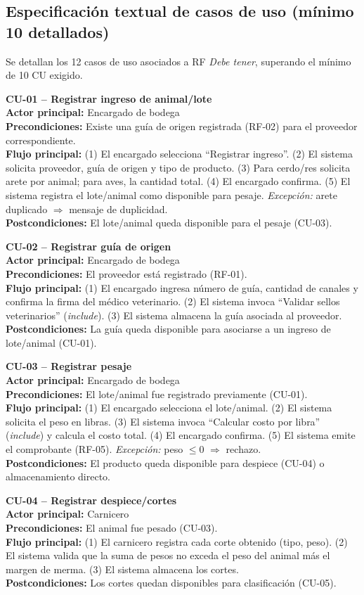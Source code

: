 \documentclass[11pt,a4paper]{article}
\begin{document}
\subsection{Especificación textual de casos de uso (mínimo 10 detallados)}
Se detallan los 12 casos de uso asociados a RF \textit{Debe tener}, superando el mínimo de 10 CU exigido.

\newcommand{\cuitem}[6]{%
\noindent\textbf{#1 -- #2}\\
\textbf{Actor principal:} #3\\
\textbf{Precondiciones:} #4\\
\textbf{Flujo principal:} #5\\
\textbf{Postcondiciones:} #6
\vspace{0.35cm}
}

\cuitem{CU-01}{Registrar ingreso de animal/lote}{Encargado de bodega}{Existe una guía de origen registrada (RF-02) para el proveedor correspondiente.}{
(1) El encargado selecciona ``Registrar ingreso''. (2) El sistema solicita proveedor, guía de origen y tipo de producto. (3) Para cerdo/res solicita arete por animal; para aves, la cantidad total. (4) El encargado confirma. (5) El sistema registra el lote/animal como disponible para pesaje. \textit{Excepción:} arete duplicado $\Rightarrow$ mensaje de duplicidad.}{
El lote/animal queda disponible para el pesaje (CU-03).}

\cuitem{CU-02}{Registrar guía de origen}{Encargado de bodega}{El proveedor está registrado (RF-01).}{
(1) El encargado ingresa número de guía, cantidad de canales y confirma la firma del médico veterinario. (2) El sistema invoca ``Validar sellos veterinarios'' (\textit{include}). (3) El sistema almacena la guía asociada al proveedor.}{
La guía queda disponible para asociarse a un ingreso de lote/animal (CU-01).}

\cuitem{CU-03}{Registrar pesaje}{Encargado de bodega}{El lote/animal fue registrado previamente (CU-01).}{
(1) El encargado selecciona el lote/animal. (2) El sistema solicita el peso en libras. (3) El sistema invoca ``Calcular costo por libra'' (\textit{include}) y calcula el costo total. (4) El encargado confirma. (5) El sistema emite el comprobante (RF-05). \textit{Excepción:} peso $\leq 0$ $\Rightarrow$ rechazo.}{
El producto queda disponible para despiece (CU-04) o almacenamiento directo.}

\cuitem{CU-04}{Registrar despiece/cortes}{Carnicero}{El animal fue pesado (CU-03).}{
(1) El carnicero registra cada corte obtenido (tipo, peso). (2) El sistema valida que la suma de pesos no exceda el peso del animal más el margen de merma. (3) El sistema almacena los cortes.}{
Los cortes quedan disponibles para clasificación (CU-05).}
\end{document}
